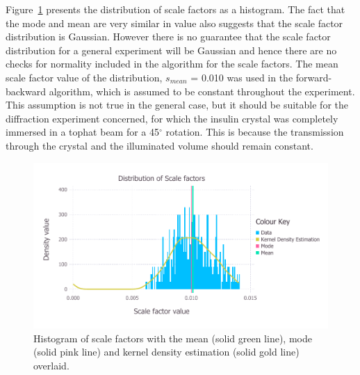 Figure~\ref{fig:Scale factor distribution after outlier removal - insulin} presents the distribution of scale factors as a histogram.
The fact that the mode and mean are very similar in value also suggests that the scale factor distribution is Gaussian.
However there is no guarantee that the scale factor distribution for a general experiment will be Gaussian and hence there are no checks for normality included in the algorithm for the scale factors.
The mean scale factor value of the distribution, $s_{mean}$ = 0.010 was used in the forward-backward algorithm, which is assumed to be constant throughout the experiment.
This assumption is not true in the general case, but it should be suitable for the diffraction experiment concerned, for which the insulin crystal was completely immersed in a tophat beam for a 45$^{\circ}$ rotation.
This is because the transmission through the crystal and the illuminated volume should remain constant.
\begin{figure}[ht!]
    \centering
    \includegraphics[width=1.0\textwidth]{figures/datared/ScaleFac_Distribution.pdf}
    \caption[Histogram of scale factors for insulin dataset.]{Histogram of scale factors with the mean (solid green line), mode (solid pink line) and kernel density estimation (solid gold line) overlaid.}
    \label{fig:Scale factor distribution after outlier removal - insulin}
\end{figure}

